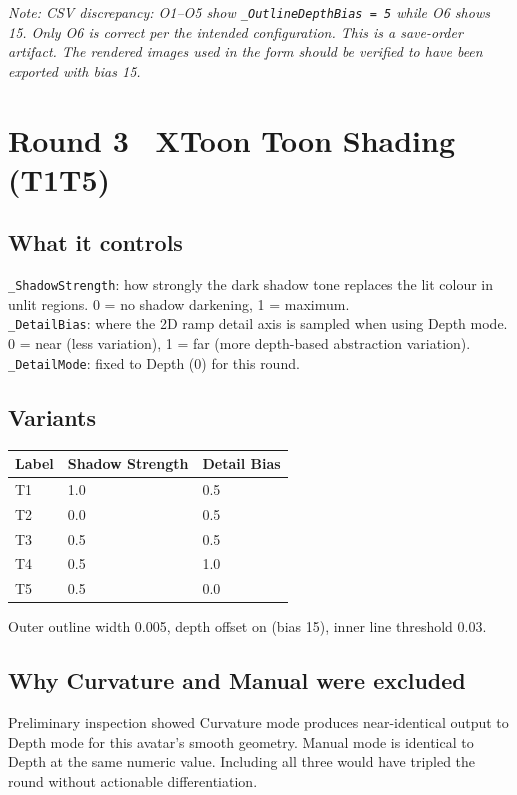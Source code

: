 \documentclass[11pt,a4paper]{article}
\newcommand{\prop}[1]{\texttt{#1}}
\newcommand{\note}[1]{{\small\color{notegray}\textit{Note: #1}}}
\begin{document}
\note{CSV discrepancy: O1--O5 show \prop{\_OutlineDepthBias = 5} while O6 shows 15. Only O6 is correct per the intended configuration. This is a save-order artifact. The rendered images used in the form should be verified to have been exported with bias 15.}

\bigskip

\section*{Round 3 \textemdash\ XToon Toon Shading (T1\textendash T5)}

\subsection*{What it controls}
\prop{\_ShadowStrength}: how strongly the dark shadow tone replaces the lit colour in unlit regions. 0 = no shadow darkening, 1 = maximum.\\
\prop{\_DetailBias}: where the 2D ramp detail axis is sampled when using Depth mode. 0 = near (less variation), 1 = far (more depth-based abstraction variation).\\
\prop{\_DetailMode}: fixed to Depth (0) for this round.

\subsection*{Variants}

\begin{tabular}{lll}
\toprule
\textbf{Label} & \textbf{Shadow Strength} & \textbf{Detail Bias} \\
\midrule
T1 & 1.0 & 0.5 \\
T2 & 0.0 & 0.5 \\
T3 & 0.5 & 0.5 \\
T4 & 0.5 & 1.0 \\
T5 & 0.5 & 0.0 \\
\bottomrule
\end{tabular}

\smallskip
\noindent Outer outline width 0.005, depth offset on (bias 15), inner line threshold 0.03.

\subsection*{Why Curvature and Manual were excluded}
Preliminary inspection showed Curvature mode produces near-identical output to Depth mode for this avatar's smooth geometry. Manual mode is identical to Depth at the same numeric value. Including all three would have tripled the round without actionable differentiation.
\end{document}
